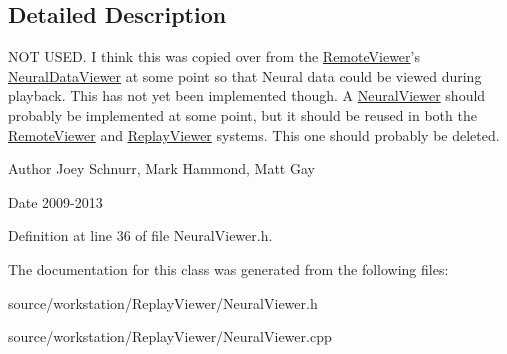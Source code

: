 \subsection{Detailed Description}
N\-O\-T U\-S\-E\-D. I think this was copied over from the \hyperlink{class_remote_viewer}{Remote\-Viewer}'s \hyperlink{class_neural_data_viewer}{Neural\-Data\-Viewer} at some point so that Neural data could be viewed during playback. This has not yet been implemented though. A \hyperlink{class_neural_viewer}{Neural\-Viewer} should probably be implemented at some point, but it should be reused in both the \hyperlink{class_remote_viewer}{Remote\-Viewer} and \hyperlink{class_replay_viewer}{Replay\-Viewer} systems. This one should probably be deleted. 

\begin{DoxyAuthor}{Author}
Joey Schnurr, Mark Hammond, Matt Gay 
\end{DoxyAuthor}
\begin{DoxyDate}{Date}
2009-\/2013 
\end{DoxyDate}


Definition at line 36 of file Neural\-Viewer.\-h.



The documentation for this class was generated from the following files\-:\begin{DoxyCompactItemize}
\item 
source/workstation/\-Replay\-Viewer/Neural\-Viewer.\-h\item 
source/workstation/\-Replay\-Viewer/Neural\-Viewer.\-cpp\end{DoxyCompactItemize}
